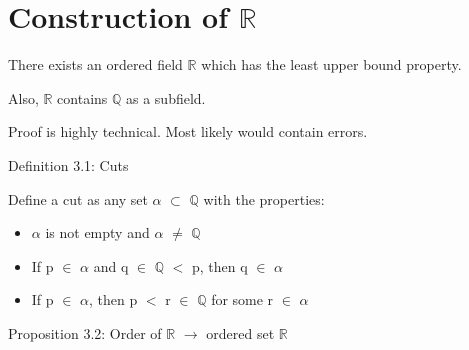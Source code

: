 \newpage
\section[Day 3: Existence of $\mathbb{R}$]{Construction of $\mathbb{R}$}

	\begin{adjustbox}{minipage=16cm, right, vspace=0.1cm 0cm}
		There exists an ordered field $\mathbb{R}$ which has the
		least upper bound property.

		Also, $\mathbb{R}$ contains $\mathbb{Q}$ as a subfield.

		{\color{red} Proof is highly technical. Most likely would contain errors.}
	\end{adjustbox}

	\vspace{0.5cm}
	


{ \color{blue} Definition 3.1: Cuts }

	\begin{adjustbox}{minipage=16cm, right, vspace=0.1cm 0cm}
		Define a cut as any set $\alpha$ $\subset$ $\mathbb{Q}$ with the properties:
	\end{adjustbox}

	\begin{itemize}[leftmargin=2cm, itemsep=0.1cm]
		\item $\alpha$ is not empty and $\alpha$ $\not =$ $\mathbb{Q}$
		
		\item If p $\in$ $\alpha$ and q $\in$ $\mathbb{Q}$ $<$ p,
			then q $\in$ $\alpha$
		
			\item If p $\in$ $\alpha$, then p $<$ r $\in$ $\mathbb{Q}$ for
			some r $\in$ $\alpha$
	\end{itemize}

	\vspace{0.5cm}



{ \color{blue} Proposition 3.2: Order of $\mathbb{R}$ $\rightarrow$ ordered set $\mathbb{R}$ }

